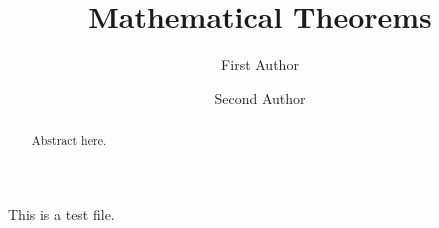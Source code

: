 \documentclass{amsart}
\theoremstyle{remark}
\numberwithin{equation}{section}
\begin{document}

\title{Mathematical Theorems}


\author{First Author}
\address{University of \ldots}


\author{Second Author}
\address{Address}



\begin{abstract}
Abstract here. 
\end{abstract}


\maketitle


\tableofcontents

This is a test file. 
\end{document}
